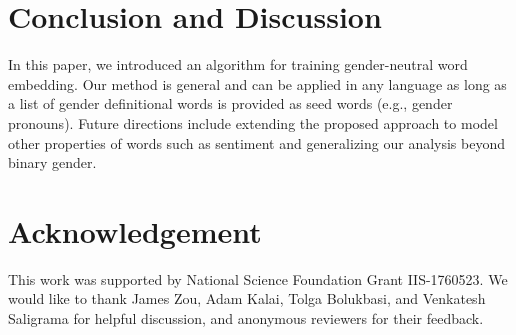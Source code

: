 \section{Conclusion and Discussion}
\label{sec:conclusion}
In this paper, we introduced an algorithm for training gender-neutral word embedding. Our method is general and can be applied in any language as long as a list of gender definitional words is provided as seed words (e.g., gender pronouns). Future directions include extending the proposed approach to model other properties of words such as sentiment and generalizing our analysis beyond binary gender. 

\section*{Acknowledgement}
This work was supported by National Science Foundation Grant IIS-1760523. We would like to thank James Zou, Adam Kalai, Tolga Bolukbasi, and Venkatesh Saligrama for helpful discussion, and anonymous reviewers for their feedback.

